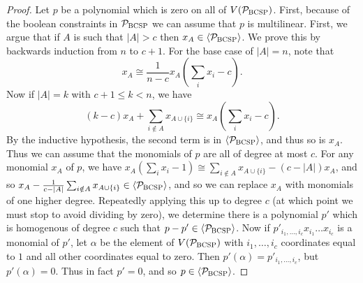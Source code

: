 \begin{proof}
Let $p$ be a polynomial which is zero on all of $V(\mathcal P_{\textsc{BCSP}})$. First, because of the boolean constraints in $\mathcal P_{\textsc{BCSP}}$ we can assume that $p$ is multilinear. First, we argue that if $A$ is such that $|A| > c$ then $x_A \in \langle \mathcal P_{\textsc{BCSP}} \rangle$. We prove this by backwards induction from $n$ to $c+1$. For the base case of $|A| = n$, note that 
\[x_A \cong \frac{1}{n-c} x_A(\sum_i x_i - c).\]
Now if $|A| = k$ with $c+1 \leq k < n$, we have
\[\left(k-c\right)x_A + \sum_{i \notin A} x_{A \cup \{i\}} \cong x_A(\sum_i x_i - c).\]
By the inductive hypothesis, the second term is in $\langle \mathcal P_{\textsc{BCSP}} \rangle$, and thus so is $x_A$. Thus we can assume that the monomials of $p$ are all of degree at most $c$. For any monomial $x_A$ of $p$, we have $x_A(\sum_i x_i - 1) \cong \sum_{i \notin A} x_{A \cup \{i\}} - (c-|A|)x_A$, and so $x_A - \frac{1}{c - |A|}\sum_{i \notin A} x_{A \cup \{i\}} \in \langle \mathcal P_{\textsc{BCSP}} \rangle$, and so we can replace $x_A$ with monomials of one higher degree. Repeatedly applying this up to degree $c$ (at which point we must stop to avoid dividing by zero), we determine there is a polynomial $p'$ which is homogenous of degree $c$ such that $p - p' \in \langle \mathcal P_{\textsc{BCSP}} \rangle$. Now if $p'_{i_1,\dots,i_c}x_{i_1}\dots x_{i_c}$ is a monomial of $p'$, let $\alpha$ be the element of $V(\mathcal P_{\textsc{BCSP}})$ with $i_1,\dots,i_c$ coordinates equal to $1$ and all other coordinates equal to zero. Then $p'(\alpha) = p'_{i_1,\dots,i_c}$, but $p'(\alpha) = 0$. Thus in fact $p' = 0$, and so $p \in \langle \mathcal P_{\textsc{BCSP}} \rangle$.
\end{proof}

